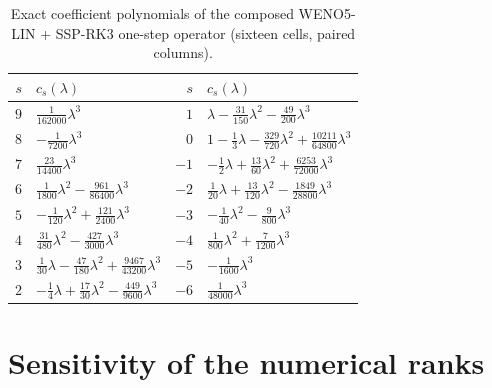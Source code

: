 \documentclass[11pt,a4paper]{article}
\begin{document}
\begin{table}[htbp]
\centering
\caption{Exact coefficient polynomials of the composed WENO5-LIN + SSP-RK3 one-step operator (sixteen cells, paired columns).}
\label{tab:coeff-rk3}
\begin{tabular}{@{}rl@{\qquad}rl@{}}
\toprule
$s$ & $c_s(\lambda)$                                                                       & $s$  & $c_s(\lambda)$                                                                            \\
\midrule
$9$ & $\tfrac{1}{162000}\lambda^{3}$                                                       & $1$  & $\lambda - \tfrac{31}{150}\lambda^{2} - \tfrac{49}{200}\lambda^{3}$                       \\
$8$ & $-\tfrac{1}{7200}\lambda^{3}$                                                        & $0$  & $1 - \tfrac{1}{3}\lambda - \tfrac{329}{720}\lambda^{2} + \tfrac{10211}{64800}\lambda^{3}$ \\
$7$ & $\tfrac{23}{14400}\lambda^{3}$                                                       & $-1$ & $-\tfrac{1}{2}\lambda + \tfrac{13}{60}\lambda^{2} + \tfrac{6253}{72000}\lambda^{3}$       \\
$6$ & $\tfrac{1}{1800}\lambda^{2} - \tfrac{961}{86400}\lambda^{3}$                         & $-2$ & $\tfrac{1}{20}\lambda + \tfrac{13}{120}\lambda^{2} - \tfrac{1849}{28800}\lambda^{3}$      \\
$5$ & $-\tfrac{1}{120}\lambda^{2} + \tfrac{121}{2400}\lambda^{3}$                          & $-3$ & $-\tfrac{1}{40}\lambda^{2} - \tfrac{9}{800}\lambda^{3}$                                   \\
$4$ & $\tfrac{31}{480}\lambda^{2} - \tfrac{427}{3000}\lambda^{3}$                          & $-4$ & $\tfrac{1}{800}\lambda^{2} + \tfrac{7}{1200}\lambda^{3}$                                  \\
$3$ & $\tfrac{1}{30}\lambda - \tfrac{47}{180}\lambda^{2} + \tfrac{9467}{43200}\lambda^{3}$ & $-5$ & $-\tfrac{1}{1600}\lambda^{3}$                                                             \\
$2$ & $-\tfrac{1}{4}\lambda + \tfrac{17}{30}\lambda^{2} - \tfrac{449}{9600}\lambda^{3}$    & $-6$ & $\tfrac{1}{48000}\lambda^{3}$                                                             \\
\bottomrule
\end{tabular}
\end{table}

\section{Sensitivity of the numerical ranks}\label{app:sensitivity}
\end{document}
